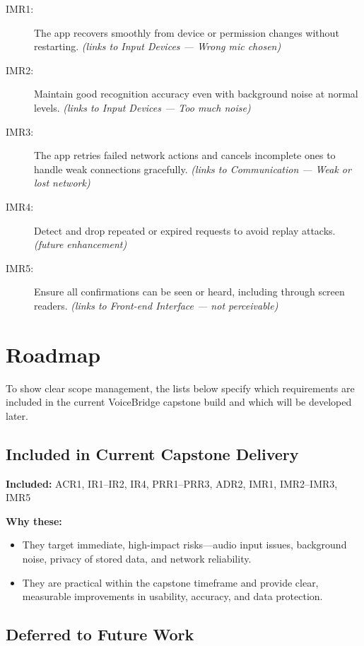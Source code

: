 \documentclass{article}
\begin{document}
\begin{description}
  \item[IMR1:] The app recovers smoothly from device or permission changes without restarting. \emph{(links to Input Devices — Wrong mic chosen)}
  \item[IMR2:] Maintain good recognition accuracy even with background noise at normal levels. \emph{(links to Input Devices — Too much noise)}
  \item[IMR3:] The app retries failed network actions and cancels incomplete ones to handle weak connections gracefully. \emph{(links to Communication — Weak or lost network)}
  \item[IMR4:] Detect and drop repeated or expired requests to avoid replay attacks. \emph{(future enhancement)}
  \item[IMR5:] Ensure all confirmations can be seen or heard, including through screen readers. \emph{(links to Front-end Interface — not perceivable)}
\end{description}

\section{Roadmap}

To show clear scope management, the lists below specify which requirements are included in the current VoiceBridge capstone build and which will be developed later.

\subsection{Included in Current Capstone Delivery}

\noindent \textbf{Included:} ACR1, IR1--IR2, IR4, PRR1--PRR3, ADR2, IMR1, IMR2--IMR3, IMR5

\vspace{2mm}
\noindent \textbf{Why these:}
\begin{itemize}
  \item They target immediate, high-impact risks—audio input issues, background noise, privacy of stored data, and network reliability.
  \item They are practical within the capstone timeframe and provide clear, measurable improvements in usability, accuracy, and data protection.
\end{itemize}

\subsection{Deferred to Future Work}
\end{document}
